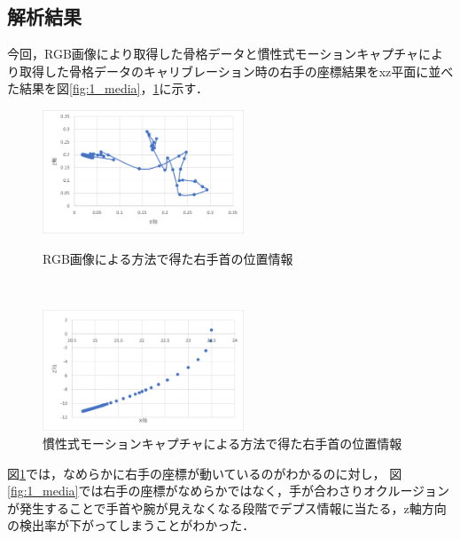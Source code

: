 \documentclass[titlepage]{jarticle}
\begin{document}
\subsection{解析結果}
今回，RGB画像により取得した骨格データと慣性式モーションキャプチャにより取得した骨格データのキャリブレーション時の右手の座標結果をxz平面に並べた結果を図\ref{fig:1_media}，\ref{fig:1_mocopi}に示す．
\begin{figure}[h]
  \centering
  \begin{minipage}{6cm}
    \centering
    \includegraphics[width=6cm]{img/media1.png}
    \caption{RGB画像による方法で得た右手首の位置情報}
    \label{fig:1_media}
  \end{minipage}\\
  \begin{minipage}{6cm}
    \centering
    \includegraphics[width=6cm]{img/mocopi1.png}
    \caption{慣性式モーションキャプチャによる方法で得た右手首の位置情報}
    \label{fig:1_mocopi}
  \end{minipage}
\end{figure}

図\ref{fig:1_mocopi}では，なめらかに右手の座標が動いているのがわかるのに対し，
図\ref{fig:1_media}では右手の座標がなめらかではなく，手が合わさりオクルージョンが発生することで手首や腕が見えなくなる段階でデプス情報に当たる，z軸方向の検出率が下がってしまうことがわかった．

\end{document}
